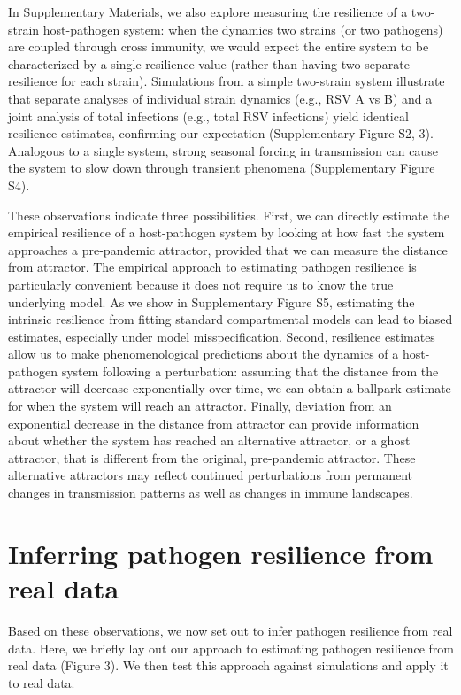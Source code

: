 \documentclass[12pt]{article}
\begin{document}
In Supplementary Materials, we also explore measuring the resilience of a two-strain host-pathogen system:
when the dynamics two strains (or two pathogens) are coupled through cross immunity, we would expect the entire system to be characterized by a single resilience value (rather than having two separate resilience for each strain).
Simulations from a simple two-strain system illustrate that separate analyses of individual strain dynamics (e.g., RSV A vs B) and a joint analysis of total infections (e.g., total RSV infections) yield identical resilience estimates, confirming our expectation (Supplementary Figure S2, 3).
Analogous to a single system, strong seasonal forcing in transmission can cause the system to slow down through transient phenomena (Supplementary Figure S4).

These observations indicate three possibilities.
First, we can directly estimate the empirical resilience of a host-pathogen system by looking at how fast the system approaches a pre-pandemic attractor, provided that we can measure the distance from attractor.
The empirical approach to estimating pathogen resilience is particularly convenient because it does not require us to know the true underlying model.
As we show in Supplementary Figure S5, estimating the intrinsic resilience from fitting standard compartmental models can lead to biased estimates, especially under model misspecification.
Second, resilience estimates allow us to make phenomenological predictions about the dynamics of a host-pathogen system following a perturbation:
assuming that the distance from the attractor will decrease exponentially over time, we can obtain a ballpark estimate for when the system will reach an attractor.
Finally, deviation from an exponential decrease in the distance from attractor can provide information about whether the system has reached an alternative attractor, or a ghost attractor, that is different from the original, pre-pandemic attractor.
These alternative attractors may reflect continued perturbations from permanent changes in transmission patterns as well as changes in immune landscapes.

\section*{Inferring pathogen resilience from real data}

Based on these observations, we now set out to infer pathogen resilience from real data.
Here, we briefly lay out our approach to estimating pathogen resilience from real data (Figure 3).
We then test this approach against simulations and apply it to real data.
\end{document}
